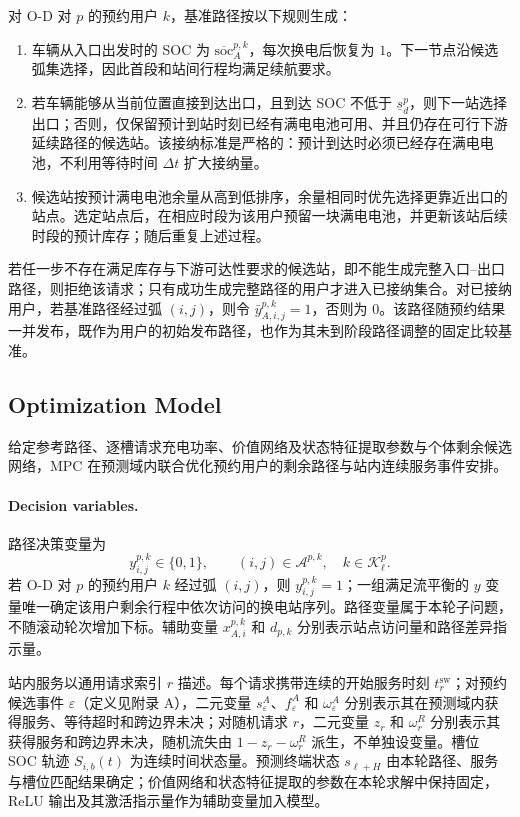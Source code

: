 \documentclass[12pt,a4paper,UTF8]{ctexart}
\begin{document}
对 O-D 对 $p$ 的预约用户 $k$，基准路径按以下规则生成：
\begin{enumerate}
  \item 车辆从入口出发时的 SOC 为 $\overline{\mathrm{soc}}_A^{p,k}$，每次换电后恢复为 $1$。下一节点沿候选弧集选择，因此首段和站间行程均满足续航要求。
  \item 若车辆能够从当前位置直接到达出口，且到达 SOC 不低于 $\underline s_d^p$，则下一站选择出口；否则，仅保留预计到站时刻已经有满电电池可用、并且仍存在可行下游延续路径的候选站。该接纳标准是严格的：预计到达时必须已经存在满电电池，不利用等待时间 $\Delta t$ 扩大接纳量。
  \item 候选站按预计满电电池余量从高到低排序，余量相同时优先选择更靠近出口的站点。选定站点后，在相应时段为该用户预留一块满电电池，并更新该站后续时段的预计库存；随后重复上述过程。
\end{enumerate}

若任一步不存在满足库存与下游可达性要求的候选站，即不能生成完整入口--出口路径，则拒绝该请求；只有成功生成完整路径的用户才进入已接纳集合。对已接纳用户，若基准路径经过弧 $(i,j)$，则令 $\bar y_{A,i,j}^{p,k}=1$，否则为 $0$。该路径随预约结果一并发布，既作为用户的初始发布路径，也作为其未到阶段路径调整的固定比较基准。


\subsection{Optimization Model}

给定参考路径、逐槽请求充电功率、价值网络及状态特征提取参数与个体剩余候选网络，MPC 在预测域内联合优化预约用户的剩余路径与站内连续服务事件安排。

\paragraph{Decision variables.}
路径决策变量为
\[
y_{i,j}^{p,k}\in\{0,1\},
\qquad
(i,j)\in\mathcal A^{p,k},
\quad
k\in\mathcal K_\ell^p.
\]
若 O-D 对 $p$ 的预约用户 $k$ 经过弧 $(i,j)$，则 $y_{i,j}^{p,k}=1$；一组满足流平衡的 $y$ 变量唯一确定该用户剩余行程中依次访问的换电站序列。路径变量属于本轮子问题，不随滚动轮次增加下标。辅助变量 $x_{A,i}^{p,k}$ 和 $d_{p,k}$ 分别表示站点访问量和路径差异指示量。

站内服务以通用请求索引 $r$ 描述。每个请求携带连续的开始服务时刻 $t_r^{\mathrm{sw}}$；对预约候选事件 $\varepsilon$（定义见附录 A），二元变量 $s_\varepsilon^A$、$f_\varepsilon^A$ 和 $\omega_\varepsilon^A$ 分别表示其在预测域内获得服务、等待超时和跨边界未决；对随机请求 $r$，二元变量 $z_r$ 和 $\omega_r^R$ 分别表示其获得服务和跨边界未决，随机流失由 $1-z_r-\omega_r^R$ 派生，不单独设变量。槽位 SOC 轨迹 $S_{i,b}(t)$ 为连续时间状态量。预测终端状态 $s_{\ell+H}$ 由本轮路径、服务与槽位匹配结果确定；价值网络和状态特征提取的参数在本轮求解中保持固定，ReLU 输出及其激活指示量作为辅助变量加入模型。
\end{document}
